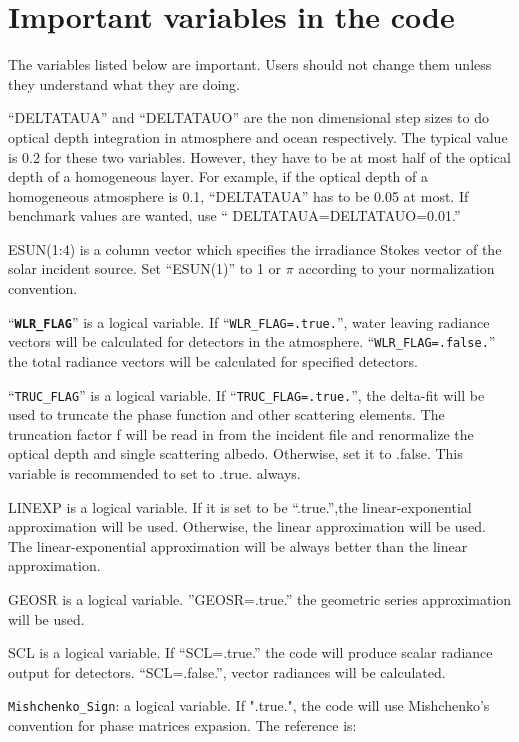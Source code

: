 \documentclass[10pt,letterpaper]{article}
\begin{document}
\section{Important variables in the code}
The variables listed below are important.  Users should not change them unless they understand what they are doing.

``DELTATAUA''  and ``DELTATAUO'' are the non dimensional step sizes to do optical depth integration in atmosphere and ocean respectively.  The typical value is 0.2 for these two variables.  However, they have to be at most half of the optical depth of a homogeneous layer.  For example, if the optical depth of a homogeneous atmosphere is 0.1, ``DELTATAUA'' has to be 0.05 at most.  If benchmark values are wanted, use `` DELTATAUA=DELTATAUO=0.01.''

ESUN(1:4) is a column vector which specifies the irradiance Stokes vector of the solar incident source.  Set ``ESUN(1)'' to 1 or $\pi$ according to your normalization convention.

``{\bf \verb+WLR_FLAG+}'' is a logical variable.  If ``\verb+WLR_FLAG=.true.+'', water leaving radiance vectors will be calculated for detectors in the atmosphere.
``\verb+WLR_FLAG=.false.+'' the total radiance vectors will be calculated for specified detectors.

``\verb+TRUC_FLAG+'' is a logical variable. If  ``\verb+TRUC_FLAG=.true.+'', the delta-fit will be used to truncate the phase function and other scattering elements.  The truncation factor f will be read in from the incident file and renormalize the optical depth and single scattering albedo.  Otherwise, set it to .false.  This variable is recommended to set to .true. always.

LINEXP is a logical variable.  If it is set to be ``.true.'',the linear-exponential approximation will be used.  Otherwise, the linear approximation will be used.  The linear-exponential approximation will be always better than the linear approximation.

GEOSR is a logical variable.  ''GEOSR=.true.''  the geometric series approximation  will be used.

SCL is a logical variable.  If ``SCL=.true.'' the code will produce scalar radiance output for detectors. ``SCL=.false.'', vector radiances will be calculated.

\verb+Mishchenko_Sign+: a logical variable.  If ".true.", the code will use Mishchenko's convention for phase matrices expasion.  The reference is:
\end{document}
